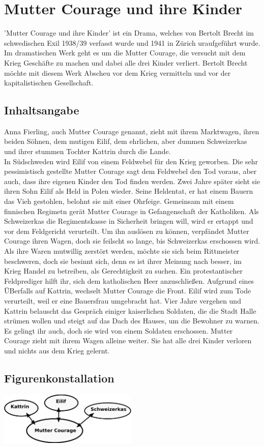 \documentclass[a4paper]{article}
\begin{document}
        \section{Mutter Courage und ihre Kinder}

	'Mutter Courage und ihre Kinder' ist ein Drama, welches von Bertolt Brecht im schwedischen Exil 1938/39 verfasst wurde und 1941 in Zürich uraufgeführt wurde. Im dramatischen Werk geht es um die Mutter Courage, die versucht mit dem Krieg Geschäfte zu machen und dabei alle drei Kinder verliert. Bertolt Brecht möchte mit diesem Werk Abscheu vor dem Krieg vermitteln und vor der kapitalistischen Gesellschaft.
        
	\subsection{Inhaltsangabe}        

	Anna Fierling, auch Mutter Courage genannt, zieht mit ihrem Marktwagen, ihren beiden Söhnen, dem mutigen Eilif, dem ehrlichen, aber dummen Schweizerkas und ihrer stummen Tochter Kattrin durch die Lande.\\
        In Südschweden wird Eilif von einem Feldwebel für den Krieg geworben. Die sehr pessimistisch gestellte Mutter Courage sagt dem Feldwebel den Tod voraus, aber auch, dass ihre eigenen Kinder den Tod finden werden. Zwei Jahre später sieht sie ihren Sohn Eilif als Held in Polen wieder. Seine Heldentat, er hat einem Bauern das Vieh gestohlen, belohnt sie mit einer Ohrfeige. Gemeinsam mit einem finnischen Regimetn gerät Mutter Courage in Gefangenschaft der Katholiken. Als Schweizerkas die Regimentskasse in Sicherheit bringen will, wird er ertappt und vor dem Feldgericht verurteilt. Um ihn auslösen zu können, verpfändet Mutter Courage ihren Wagen, doch sie feilscht so lange, bis Schweizerkas erschossen wird. Als ihre Waren mutwillig zerstört werden, möchte sie sich beim Rittmeister beschweren, doch sie besinnt sich, denn es ist ihrer Meinung nach besser, im Krieg Handel zu betreiben, als Gerechtigkeit zu suchen. Ein protestantischer Feldprediger hilft ihr, sich dem katholischen Heer anzuschließen. Aufgrund eines ÜBerfalls auf Kattrin, wechselt Mutter Courage die Front. Eilif wird zum Tode verurteilt, weil er eine Bauersfrau umgebracht hat. Vier Jahre vergehen und Kattrin belauscht das Gespräch einiger kaiserlichen Soldaten, die die Stadt Halle strümen wollen und steigt auf das Dach des Hauses, um die Bewohner zu warnen. Es gelingt ihr auch, doch sie wird von einem Soldaten erschossen. Mutter Courage zieht mit ihrem Wagen alleine weiter. Sie hat alle drei Kinder verloren und nichts aus dem Krieg gelernt.
        
        \subsection{Figurenkonstallation}
	\includegraphics[width=250px]{img/figuren.png}
        
\end{document}
